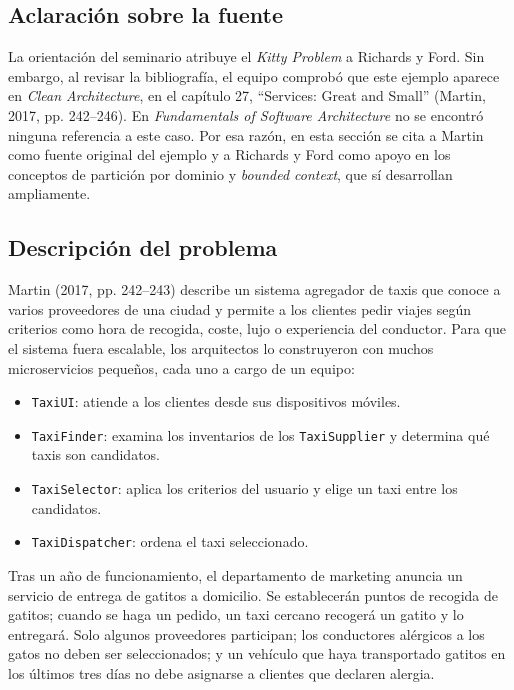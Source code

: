 \documentclass[11pt,a4paper]{article}
\begin{document}
\subsection{Aclaración sobre la fuente}

La orientación del seminario atribuye el \emph{Kitty Problem} a Richards y Ford. Sin embargo, al revisar la bibliografía, el equipo comprobó que este ejemplo aparece en \emph{Clean Architecture}, en el capítulo 27, ``Services: Great and Small'' (Martin, 2017, pp. 242--246). En \emph{Fundamentals of Software Architecture} no se encontró ninguna referencia a este caso. Por esa razón, en esta sección se cita a Martin como fuente original del ejemplo y a Richards y Ford como apoyo en los conceptos de partición por dominio y \emph{bounded context}, que sí desarrollan ampliamente.

\subsection{Descripción del problema}

Martin (2017, pp. 242--243) describe un sistema agregador de taxis que conoce a varios proveedores de una ciudad y permite a los clientes pedir viajes según criterios como hora de recogida, coste, lujo o experiencia del conductor. Para que el sistema fuera escalable, los arquitectos lo construyeron con muchos microservicios pequeños, cada uno a cargo de un equipo:

\begin{itemize}[leftmargin=1.5em]
  \item \texttt{TaxiUI}: atiende a los clientes desde sus dispositivos móviles.
  \item \texttt{TaxiFinder}: examina los inventarios de los \texttt{TaxiSupplier} y determina qué taxis son candidatos.
  \item \texttt{TaxiSelector}: aplica los criterios del usuario y elige un taxi entre los candidatos.
  \item \texttt{TaxiDispatcher}: ordena el taxi seleccionado.
\end{itemize}

Tras un año de funcionamiento, el departamento de marketing anuncia un servicio de entrega de gatitos a domicilio. Se establecerán puntos de recogida de gatitos; cuando se haga un pedido, un taxi cercano recogerá un gatito y lo entregará. Solo algunos proveedores participan; los conductores alérgicos a los gatos no deben ser seleccionados; y un vehículo que haya transportado gatitos en los últimos tres días no debe asignarse a clientes que declaren alergia.
\end{document}
